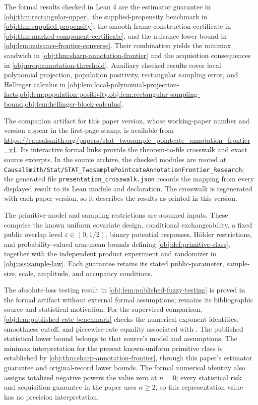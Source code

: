 \documentclass[11pt]{article}
\begin{document}
The formal results checked in Lean 4 are the estimator guarantee in \cref{obj:thm:rectangular-upper}, the supplied-propensity benchmark in \cref{obj:thm:supplied-propensity}, the smooth-frame construction certificate in \cref{obj:thm:marked-component-certificate}, and the nuisance lower bound in \cref{obj:lem:nuisance-frontier-converse}. Their combination yields the minimax sandwich in \cref{obj:thm:sharp-annotation-frontier} and the acquisition consequences in \cref{obj:prop:annotation-threshold}. Auxiliary checked results cover local polynomial projection, population positivity, rectangular sampling error, and Hellinger calculus in \cref{obj:lem:local-polynomial-projection-facts,obj:lem:population-positivity,obj:lem:rectangular-sampling-bound,obj:lem:hellinger-block-calculus}.

The companion artifact for this paper version, whose working-paper number and version appear in the first-page stamp, is available from \url{https://causalsmith.org/papers/stat_twosample_pointcate_annotation_frontier_v1}. Its interactive formal links provide the theorem-to-file crosswalk and exact source excerpts. In the source archive, the checked modules are rooted at \texttt{CausalSmith/Stat/STAT\_TwosamplePointcateAnnotationFrontier\_Research}; the generated file \texttt{presentation\_crosswalk.json} records the mapping from every displayed result to its Lean module and declaration. The crosswalk is regenerated with each paper version, so it describes the results as printed in this version.

The primitive-model and sampling restrictions are assumed inputs. These comprise the known uniform covariate design, conditional exchangeability, a fixed public overlap level \(\varepsilon\in(0,1/2)\), binary potential responses, H\"older restrictions, and probability-valued arm-mean bounds defining \cref{obj:def:primitive-class}, together with the independent product experiment and randomizer in \cref{obj:ass:sample-law}. Each guarantee retains its stated public-parameter, sample-size, scale, amplitude, and occupancy conditions.

The absolute-loss testing result in \cref{obj:lem:published-fuzzy-testing} is proved in the formal artifact without external formal assumptions; \citet[Section 3, Lemma 1]{KennedyBalakrishnanRobinsWasserman2024} remains its bibliographic source and statistical motivation. For the supervised comparison, \cref{obj:lem:published-cate-benchmark} checks the numerical exponent identities, smoothness cutoff, and piecewise-rate equality associated with \citet[Section 3, Theorem 1]{KennedyBalakrishnanRobinsWasserman2024}. The published statistical lower bound belongs to that source's model and assumptions. The minimax interpretation for the present known-uniform primitive class is established by \cref{obj:thm:sharp-annotation-frontier}, through this paper's estimator guarantee and original-record lower bounds. The formal numerical identity also assigns totalized negative powers the value zero at \(n=0\); every statistical risk and acquisition guarantee in the paper uses \(n\ge2\), so this representation value has no precision interpretation.
\end{document}
